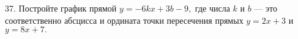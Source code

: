 37. Постройте график прямой $y=-6kx+3b-9,$ где числа $k$ и $b$ --- это соответственно абсцисса и ордината точки пересечения прямых $y=2x+3$ и $y=8x+7.$\\
